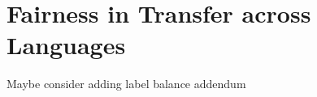 \part{Fairness in Transfer across Languages}
\label{part:crosslingual}


Maybe consider adding label balance addendum